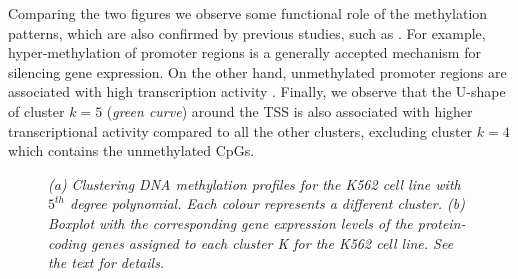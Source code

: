 Comparing the two figures we observe some functional role of the methylation patterns, which are also confirmed by previous studies, such as \citet{Vanderkraats2013}. For example, hyper-methylation of promoter regions is a generally accepted mechanism for silencing gene expression. On the other hand, unmethylated promoter regions are associated with high transcription activity \citep{Deaton2011}. Finally, we observe that the U-shape of cluster $k=5$ (\emph{green curve}) around the TSS is also associated with higher transcriptional activity compared to all the other clusters, excluding cluster $k=4$ which contains the unmethylated CpGs.
\begin{figure}[ht!]
     \begin{center}
    \end{center}
    \caption{\emph{(a) Clustering DNA methylation profiles for the K562 cell line with $5^{th}$ degree polynomial. Each colour represents a different cluster. (b) Boxplot with the corresponding gene expression levels of the protein-coding genes assigned to each cluster K for the K562 cell line. See the text for details.}}
   \label{meth-k562-pic}
\end{figure}
